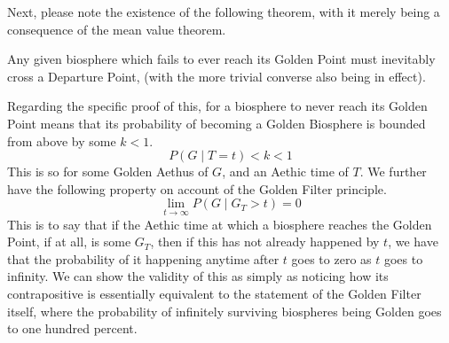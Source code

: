 Next, please note the existence of the following theorem, with it merely being a consequence of the mean value theorem. 
\begin{theorem}
    Any given biosphere which fails to ever reach its Golden Point must inevitably cross a Departure Point, (with the more trivial converse also being in effect). 
\end{theorem}
Regarding the specific proof of this, for a biosphere to never reach its Golden Point means that its probability of becoming a Golden Biosphere is bounded from above by some $k < 1$. 
\begin{equation}
    P \! \left( G \mid T = t \right) < k < 1
\end{equation}
This is so for some Golden Aethus of $G$, and an Aethic time of $T$. We further have the following property on account of the Golden Filter principle.
\begin{equation}
    \lim_{t \to \infty} P \! \left( G \mid G_T > t \right) = 0
\end{equation}
This is to say that if the Aethic time at which a biosphere reaches the Golden Point, if at all, is some $G_T$, then if this has not already happened by $t$, we have that the probability of it happening anytime after $t$ goes to zero as $t$ goes to infinity. We can show the validity of this as simply as noticing how its contrapositive is essentially equivalent to the statement of the Golden Filter itself, where the probability of infinitely surviving biospheres being Golden goes to one hundred percent. 

